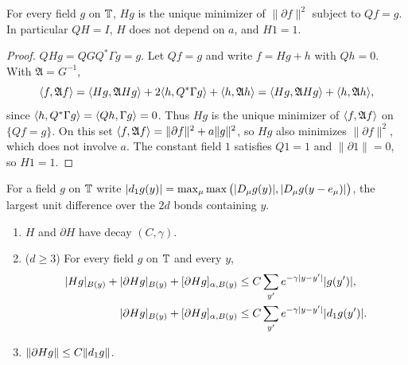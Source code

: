 \begin{lemma}\label{lem:H-variational}
For every field $g$ on $\mathbb T$, $Hg$ is the unique minimizer of $\|\partial f\|^2$ subject to $Qf=g$. In particular $QH=I$, $H$ does not depend on $a$, and $H1=1$.
\end{lemma}

\begin{proof}
$QHg=QGQ^*\Gamma g=g$. Let $Qf=g$ and write $f=Hg+h$ with $Qh=0$. With $\mathfrak A=G^{-1}$,
\[
\langle f,\mathfrak Af\rangle=\langle Hg,\mathfrak AHg\rangle+2\langle h,Q^*\Gamma g\rangle+\langle h,\mathfrak Ah\rangle=\langle Hg,\mathfrak AHg\rangle+\langle h,\mathfrak Ah\rangle,
\]
since $\langle h,Q^*\Gamma g\rangle=\langle Qh,\Gamma g\rangle=0$. Thus $Hg$ is the unique minimizer of $\langle f,\mathfrak Af\rangle$ on $\{Qf=g\}$. On this set $\langle f,\mathfrak Af\rangle=\|\partial f\|^2+a\|g\|^2$, so $Hg$ also minimizes $\|\partial f\|^2$, which does not involve $a$. The constant field $1$ satisfies $Q1=1$ and $\|\partial1\|=0$, so $H1=1$.
\end{proof}

For a field $g$ on $\mathbb T$ write $|d_1 g(y)|=\max_\mu\max\big(|D_\mu g(y)|,|D_\mu g(y-e_\mu)|\big)$, the largest unit difference over the $2d$ bonds containing $y$.

\begin{theorem}\label{thm:H-scalar}
\begin{enumerate}[label=(\alph*)]
\item $H$ and $\partial H$ have decay $(C,\gamma)$.
\item ($d\ge3$) For every field $g$ on $\mathbb T$ and every $y$,
\begin{align*}
|Hg|_{B(y)}+|\partial Hg|_{B(y)}+[\partial Hg]_{\alpha,B(y)}&\le C\sum_{y'}e^{-\gamma|y-y'|}|g(y')|,\\
|\partial Hg|_{B(y)}+[\partial Hg]_{\alpha,B(y)}&\le C\sum_{y'}e^{-\gamma|y-y'|}|d_1 g(y')| .
\end{align*}
\item $\|\partial Hg\|\le C\|d_1 g\|$.
\end{enumerate}
\end{theorem}


